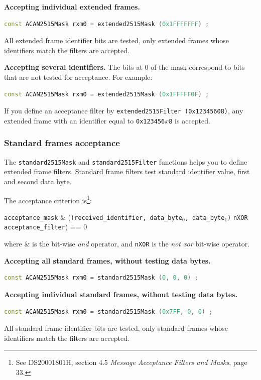 \documentclass[10pt, a4paper, obeyspaces]{extarticle}
\begin{document}
{\bf Accepting individual extended frames.}
{ \small\begin{lstlisting}[language=c++]
  const ACAN2515Mask rxm0 = extended2515Mask (0x1FFFFFFF) ;
\end{lstlisting}}
All extended frame identifier bits are tested, only extended frames whose identifiers match the filters are accepted.


{\bf Accepting several identifiers.}
The bits at 0 of the mask correspond to bits that are not tested for acceptance. For example:
{ \small\begin{lstlisting}[language=c++]
  const ACAN2515Mask rxm0 = extended2515Mask (0x1FFFFF0F) ;
\end{lstlisting}}

If you define an acceptance filter by \texttt{extended2515Filter (0x12345608)}, any extended frame with an identifier equal to \texttt{0x123456$x$8} is accepted.












\subsubsection{Standard frames acceptance}

The \texttt{standard2515Mask} and \texttt{standard2515Filter} functions helps you to define extended frame filters. Standard frame filters test standard identifier value, first and second data byte.

The acceptance criterion is\footnote{See DS20001801H, section 4.5 \emph{Message Acceptance Filters and Masks}, page 33.}:

\begin{center}\small
\texttt{acceptance\_mask} \& (\texttt{(received\_identifier, data\_byte$_0$, data\_byte$_1$)} \texttt{nXOR} \texttt{acceptance\_filter}) == 0
\end{center}
where \& is the bit-wise \emph{and} operator, and \texttt{nXOR} is the \emph{not xor} bit-wise operator.

{\bf Accepting all standard frames, without testing data bytes.}
{ \small\begin{lstlisting}[language=c++]
  const ACAN2515Mask rxm0 = standard2515Mask (0, 0, 0) ;
\end{lstlisting}}

{\bf Accepting individual standard frames, without testing data bytes.}
{ \small\begin{lstlisting}[language=c++]
  const ACAN2515Mask rxm0 = standard2515Mask (0x7FF, 0, 0) ;
\end{lstlisting}}
All standard frame identifier bits are tested, only standard frames whose identifiers match the filters are accepted.
\end{document}
